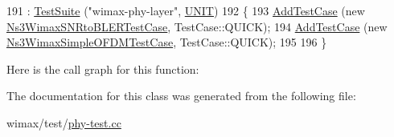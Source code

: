 \begin{DoxyCode}
191   : \hyperlink{classns3_1_1TestSuite_a904b0c40583b744d30908aeb94636d1a}{TestSuite} (\textcolor{stringliteral}{"wimax-phy-layer"}, \hyperlink{classns3_1_1TestSuite_a1ebfcab34ec8161e085e8e3a1855eae0a3885375a3787abf60431f8454b3cadbd}{UNIT})
192 \{
193   \hyperlink{classns3_1_1TestCase_a3718088e3eefd5d6454569d2e0ddd835}{AddTestCase} (\textcolor{keyword}{new} \hyperlink{classNs3WimaxSNRtoBLERTestCase}{Ns3WimaxSNRtoBLERTestCase}, TestCase::QUICK);
194   \hyperlink{classns3_1_1TestCase_a3718088e3eefd5d6454569d2e0ddd835}{AddTestCase} (\textcolor{keyword}{new} \hyperlink{classNs3WimaxSimpleOFDMTestCase}{Ns3WimaxSimpleOFDMTestCase}, TestCase::QUICK);
195 
196 \}
\end{DoxyCode}


Here is the call graph for this function\+:




The documentation for this class was generated from the following file\+:\begin{DoxyCompactItemize}
\item 
wimax/test/\hyperlink{phy-test_8cc}{phy-\/test.\+cc}\end{DoxyCompactItemize}
